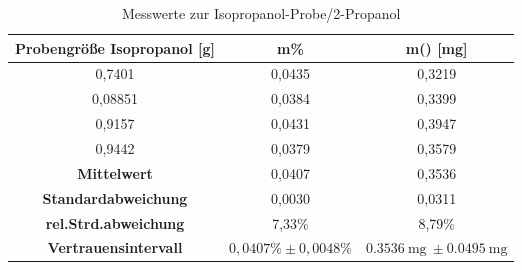   \vspace*{-2.5mm}
 \renewcommand{\arraystretch}{1.2}
 \begin{table}[h!]
 	\centering
 	\caption{Messwerte zur Isopropanol-Probe}
 	\label{tab:MesswerteIsopropanol}
 \end{table}
 \FloatBarrier 


\vspace*{-2.5mm}
\renewcommand{\arraystretch}{1.2}
\begin{table}[h!]
	\centering
	\caption{Messwerte zur Isopropanol-Probe/2-Propanol}
	\label{tab:Messwerte2Propanol}
	\begin{tabulary}{\textwidth}{C|C||C}
		\hline
		\textbf{Probengröße Isopropanol} [\si{\gram}]& \textbf{m\% }& \textbf{m()} [\si{\milli\gram}]\\
		,7401& 0,0435&0,3219\\
		0,08851& 0,0384 &0,3399\\
		
		0,9157& 0,0431 &0,3947\\
		0,9442& 0,0379 &0,3579\\
		
		\hline
		\hline
		\textbf{Mittelwert}&0,0407&0,3536 \\
		\textbf{Standard\-abweichung}&0,0030&0,0311\\
		\textbf{rel.Strd.\-abweichung}&7,33\%&8,79\% \\
		\hline
		\textbf{Vertrauensintervall}&$0,0407\% \pm 0,0048\%$&$\SI{0,3536}{\milli \gram}\ \pm \SI{0,0495}{\milli \gram}$\\
		\hline
		
	\end{tabulary}
\end{table}
\FloatBarrier 

